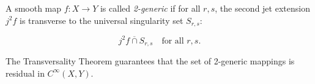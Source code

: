 A smooth map $f: X \to Y$ is called \emph{2-generic} if for all $r, s$, the second jet extension $j^2 f$ is transverse to the universal singularity set $S_{r,s}$:

$$j^2 f \overline{\cap} S_{r,s} \quad \text{for all } r, s.$$

The Transversality Theorem guarantees that the set of 2-generic mappings is residual in $C^\infty(X, Y)$.
